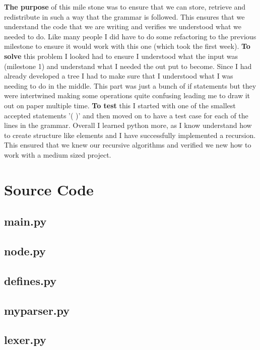 \documentclass[letterpaper,10pt]{article}
\begin{document}
\begin{mdframed}[style=MyFrame]
\textbf{The purpose} of this mile stone was to ensure that we can store, retrieve and redistribute in such a way that the grammar is followed. This ensures that we understand the code that we are writing and verifies we understood what we needed to do. Like many people I did have to do some refactoring to the previous milestone to ensure it would work with this one (which took the first week). \textbf{To solve} this problem I looked had to ensure I understood what the input was (milestone 1) and understand what I needed the out put to become. Since I had already developed a tree I had to make sure that I understood what I was needing to do in the middle. This part was just a bunch of if statements but they were intertwined making some operations quite confusing leading me to draw it out on paper multiple time. \textbf{To test} this I started with one of the smallest accepted statements '( )' and then moved on to have a test case for each of the lines in the grammar. Overall I learned python more, as I know understand how to create structure like elements and I have successfully implemented a recursion. This ensured that we knew our recursive algorithms and verified we new how to work with a medium sized project. 
\end{mdframed}



\newpage
\section{Source Code}
\subsection{main.py}

\subsection{node.py}

\subsection{defines.py}

\subsection{myparser.py}

\subsection{lexer.py}

\end{document}

